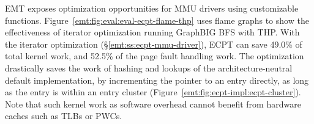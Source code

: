 EMT exposes optimization opportunities for MMU drivers using customizable functions.
Figure~\ref{emt:fig:eval:eval-ecpt-flame-thp} uses flame graphs 
	to show the effectiveness of iterator optimization running 
	GraphBIG BFS with THP. %
With the iterator optimization (\S\ref{emt:ss:ecpt-mmu-driver}), 
	ECPT can save 
	49.0\% 
	of total kernel work,
	and 
	52.5\%
	of the page fault handling work.
The optimization drastically saves the work of hashing and lookups of the architecture-neutral default implementation,
	by incrementing the pointer to an entry directly, as long as the entry is within an entry cluster (Figure~\ref{emt:fig:ecpt-impl:ecpt-cluster}).
Note that such kernel work as software overhead
	cannot benefit from hardware caches such as TLBs or PWCs.







